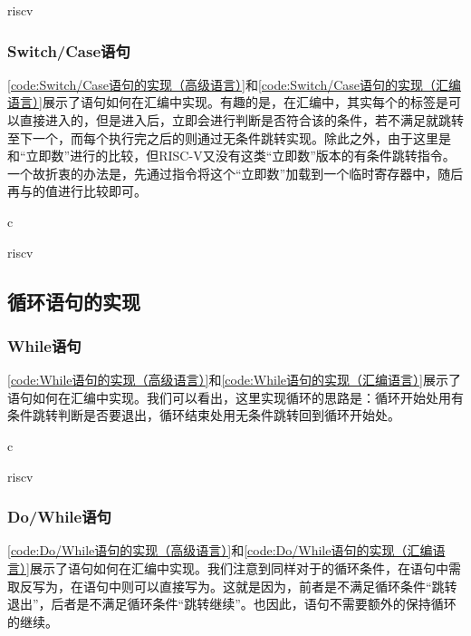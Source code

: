 \begin{Code}{riscv}
    
\end{Code}

\subsubsection{Switch/Case语句}
\cref{code:Switch/Case语句的实现（高级语言）}和\cref{code:Switch/Case语句的实现（汇编语言）}展示了语句如何在汇编中实现。有趣的是，在汇编中，其实每个的标签是可以直接进入的，但是进入后，立即会进行判断是否符合该的条件，若不满足就跳转至下一个，而每个执行完之后的则通过无条件跳转实现。除此之外，由于这里是和“立即数”进行的比较，但RISC-V又没有这类“立即数”版本的有条件跳转指令。一个故折衷的办法是，先通过指令将这个“立即数”加载到一个临时寄存器中，随后再与的值进行比较即可。
\begin{Code}{c}
    
\end{Code}

\begin{Code}{riscv}
    
\end{Code}

\subsection{循环语句的实现}

\subsubsection{While语句}
\cref{code:While语句的实现（高级语言）}和\cref{code:While语句的实现（汇编语言）}展示了语句如何在汇编中实现。我们可以看出，这里实现循环的思路是：循环开始处用有条件跳转判断是否要退出，循环结束处用无条件跳转回到循环开始处。
\begin{Code}{c}
    
\end{Code}

\begin{Code}{riscv}
    
\end{Code}

\subsubsection{Do/While语句}
\cref{code:Do/While语句的实现（高级语言）}和\cref{code:Do/While语句的实现（汇编语言）}展示了语句如何在汇编中实现。我们注意到同样对于的循环条件，在语句中需取反写为，在语句中则可以直接写为。这就是因为，前者是不满足循环条件“跳转退出”，后者是不满足循环条件“跳转继续”。也因此，语句不需要额外的保持循环的继续。 

